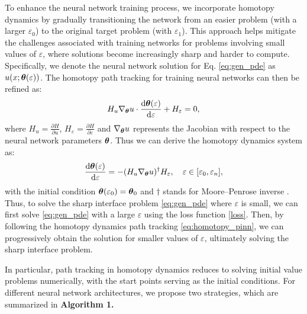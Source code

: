 To enhance the neural network training process, we incorporate homotopy dynamics by gradually transitioning the network from an easier problem (with a larger \( \varepsilon_0 \)) to the original target problem (with \( \varepsilon_1 \)). This approach helps mitigate the challenges associated with training networks for problems involving small values of \( \varepsilon \), where solutions become increasingly sharp and harder to compute. Specifically, 
 we denote the neural network solution for Eq. \eqref{eq:gen_pde} as $u(x;{\boldsymbol{\theta}}(\varepsilon))$. The homotopy path tracking for training neural networks can then be refined as:
\begin{equation}
    H_{u}\nabla_{{\boldsymbol{\theta}}}u \cdot \frac{\mathrm{d}{\boldsymbol{\theta}}(\varepsilon)}{\mathrm{d} \varepsilon} + H_{\varepsilon} = 0,
\label{eq.homo_dynamics}
\end{equation}
where $H_{u} = \frac{\partial H}{\partial u}$, $H_{\varepsilon} = \frac{\partial H}{\partial \varepsilon}$ and $\nabla_{{\boldsymbol{\theta}}}u$ represents the Jacobian with respect to the neural network parameters ${\boldsymbol{\theta}}$. Thus we can derive the homotopy dynamics system as:
\begin{equation}
 \frac{\mathrm{d} {\boldsymbol{\theta}}(\varepsilon)}{\mathrm{d} \varepsilon} = -(H_{u}\nabla_{{\boldsymbol{\theta}}}u)^{\dagger}H_{\varepsilon}, \quad \varepsilon \in [\varepsilon_0,\varepsilon_n],
\label{eq:homotopy_pinn}
\end{equation}
with the initial condition $\boldsymbol{\theta}(\varepsilon_0)=\boldsymbol{\theta}_0$ and ${\dagger}$ stands for Moore–Penrose inverse \cite{ben2006generalized}.
Thus, to solve the sharp interface problem \eqref{eq:gen_pde} where \( \varepsilon \) is small, we can first solve \eqref{eq:gen_pde} with a large \( \varepsilon \) using the loss function \eqref{loss}. Then, by following the homotopy dynamics path tracking \eqref{eq:homotopy_pinn}, we can progressively obtain the solution for smaller values of \( \varepsilon \), ultimately solving the sharp interface problem.

In particular, path tracking in homotopy dynamics reduces to solving initial value problems numerically, with the start points serving as the initial conditions. For different neural network architectures, we propose two strategies, which are summarized in {\bf Algorithm 1.}


